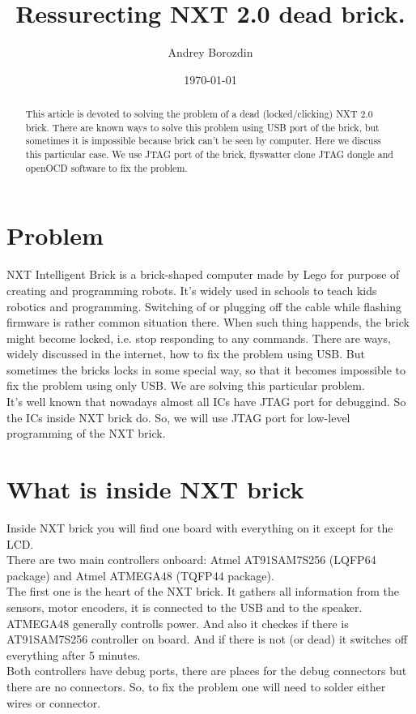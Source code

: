 \documentclass[11pt]{article}
\begin{document}
	
	\title{Ressurecting NXT 2.0 dead brick.}
	\author{Andrey Borozdin}
	\date{\today}
	\maketitle



	
	\begin{abstract}
		This article is devoted to solving the problem of a dead (locked/clicking) NXT 2.0 brick. There are known ways to solve this problem using USB port of the brick, but sometimes it is impossible because brick can't be seen by computer. Here we discuss this particular case. We use JTAG port of the brick, flyswatter clone JTAG dongle and openOCD software to fix the problem. 
	\end{abstract}


	\tableofcontents

	\section{Problem}
	NXT Intelligent Brick is a brick-shaped computer made by Lego for purpose of creating and programming robots. It's widely used in schools to teach kids robotics and programming. Switching of or plugging off the cable while flashing firmware is rather common situation there. When such thing happends, the brick might become locked, i.e. stop responding to any commands. There are ways, widely discussed in the internet, how to fix the problem using USB. But sometimes the bricks locks in some special way, so that it becomes impossible to fix the problem using only USB. We are solving this particular problem.\\

	It's well known that nowadays almost all ICs have JTAG port for debuggind. So the ICs inside NXT brick do. So, we will use JTAG port for low-level programming of the NXT brick.

	\section{What is inside NXT brick}
	Inside NXT brick you will find one board with everything on it except for the LCD.\\
	There are two main controllers onboard: Atmel AT91SAM7S256 (LQFP64 package) and Atmel ATMEGA48 (TQFP44 package).\\
	The first one is the heart of the NXT brick. It gathers all information from the sensors, motor encoders, it is connected to the USB and to the speaker.\\
	ATMEGA48 generally controlls power. And also it checkes if there is AT91SAM7S256 controller on board. And if there is not (or dead) it switches off everything after 5 minutes.\\
	Both controllers have debug ports, there are places for the debug connectors but there are no connectors. So, to fix the problem one will need to solder either wires or connector.
\end{document}
